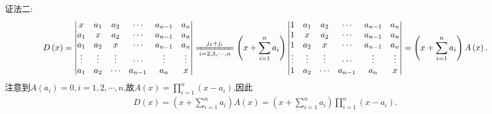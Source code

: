 \documentclass[../../main.tex]{subfiles}%
\begin{document}
\begin{solution}
{\color{blue}证法二:}
\begin{align*}
D\left( x \right) =\left| \begin{matrix}
x&		a_1&		a_2&		\cdots&		a_{n-1}&		a_n\\
a_1&		x&		a_2&		\cdots&		a_{n-1}&		a_n\\
a_1&		a_2&		x&		\cdots&		a_{n-1}&		a_n\\
\vdots&		\vdots&		\vdots&		\cdots&		\vdots&		\vdots\\
a_1&		a_2&		\cdots&		a_{n-1}&		a_n&		x\\
\end{matrix} \right|\xlongequal[i=2,3,\cdots ,n]{j_1+j_i}\left( x+\sum_{i=1}^n{a_i} \right) \left| \begin{matrix}
1&		a_1&		a_2&		\cdots&		a_{n-1}&		a_n\\
1&		x&		a_2&		\cdots&		a_{n-1}&		a_n\\
1&		a_2&		x&		\cdots&		a_{n-1}&		a_n\\
\vdots&		\vdots&		\vdots&		\cdots&		\vdots&		\vdots\\
1&		a_2&		\cdots&		a_{n-1}&		a_n&		x\\
\end{matrix} \right|=\left( x+\sum_{i=1}^n{a_i} \right) A\left( x \right) .
\end{align*}
注意到$A(a_i)=0,i=1,2,\cdots,n$,故$A(x)=\prod_{i=1}^{n}(x-a_i)$,因此
\begin{align*}
D(x)=\left( x+\sum_{i=1}^n{a_i} \right) A\left( x \right)=\left( x+\sum_{i=1}^n{a_i} \right) \prod_{i=1}^{n}(x-a_i).
\end{align*}


\end{solution}
\end{document}

